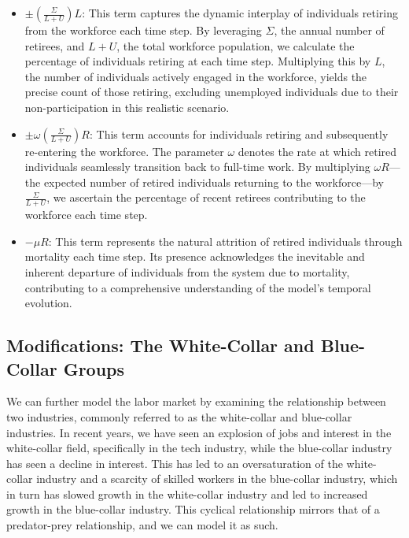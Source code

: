 \documentclass[11pt]{amsart}
\begin{document}
\begin{itemize}
    \item $\pm\left(\frac{\Sigma}{L + U}\right) L$: This term captures the dynamic interplay of individuals retiring from the workforce each time step. By leveraging $\Sigma$, the annual number of retirees, and $L + U$, the total workforce population, we calculate the percentage of individuals retiring at each time step. Multiplying this by $L$, the number of individuals actively engaged in the workforce, yields the precise count of those retiring, excluding unemployed individuals due to their non-participation in this realistic scenario.

    \item $\pm \omega\left(\frac{\Sigma}{L + U}\right) R$: This term accounts for individuals retiring and subsequently re-entering the workforce. The parameter $\omega$ denotes the rate at which retired individuals seamlessly transition back to full-time work. By multiplying $\omega R$—the expected number of retired individuals returning to the workforce—by $\frac{\Sigma}{L + U}$, we ascertain the percentage of recent retirees contributing to the workforce each time step.

    \item $-\mu R$: This term represents the natural attrition of retired individuals through mortality each time step. Its presence acknowledges the inevitable and inherent departure of individuals from the system due to mortality, contributing to a comprehensive understanding of the model's temporal evolution.
\end{itemize}

\subsection{Modifications: The White-Collar and Blue-Collar Groups}

We can further model the labor market by examining the relationship between two industries, commonly referred to as the white-collar and blue-collar industries.
In recent years, we have seen an explosion of jobs and interest in the white-collar field, specifically in the tech industry, while the blue-collar industry has seen a decline in interest.
This has led to an oversaturation of the white-collar industry and a scarcity of skilled workers in the blue-collar industry, which in turn has slowed growth in the white-collar industry and led to increased growth in the blue-collar industry.
This cyclical relationship mirrors that of a predator-prey relationship, and we can model it as such.
\end{document}
